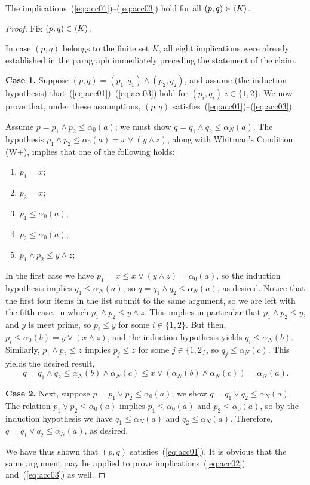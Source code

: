 \begin{claim}\label{claim:main_alpha}
  The implications~(\ref{eq:acc01})--(\ref{eq:acc03}) hold for all $(p,q) \in \langle K\rangle$.
  \end{claim}
  \begin{proof}
    Fix $(p, q) \in  \langle K\rangle$. 
  
    In case $(p,q)$ belongs to the finite set $K$, all eight implications were already 
    established in the paragraph immediately preceding the statement of the claim.
    
    \medskip
    \noindent \textbf{Case 1.}
    Suppose $(p,q) = (p_1, q_1) \wedge (p_2, q_2)$, and assume (the induction hypothesis) 
    that~(\ref{eq:acc01})--(\ref{eq:acc03}) hold for
    $(p_i,q_i)$ $i\in \{1,2\}$.
    We now prove that, under these assumptions, $(p,q)$ 
    satisfies~(\ref{eq:acc01})--(\ref{eq:acc03}).
    
    Assume $p = p_1\wedge p_2 \leq \alpha_0(a)$; we must show 
    $q=q_1\wedge q_2 \leq \alpha_N(a)$.
    The hypothesis $p_1\wedge p_2 \leq \alpha_0(a) = x\vee (y \wedge z)$, along with 
    Whitman's Condition (W+), implies that one of the following holds:
    \begin{enumerate}
      \item   $p_1=x$;  
      \item   $p_2=x$;  
      \item   $p_1\leq \alpha_0(a)$;  
      \item   $p_2\leq \alpha_0(a)$;  
      \item   $p_1\wedge p_2 \leq y \wedge z$;  
    \end{enumerate}
    In the first case we have $p_1 = x \leq x \vee (y \wedge z) = \alpha_0(a)$, so
    the induction hypothesis implies $q_1\leq \alpha_N(a)$, so 
    $q = q_1\wedge q_2\leq \alpha_N(a)$, as desired.  
    Notice that the first four items in the list submit to the same argument,
    so we are left with the fifth case, 
    in which $p_1\wedge p_2 \leq y \wedge z$. 
    This implies in particular that $p_1\wedge p_2 \leq y$, and $y$ is meet prime, so 
    $p_i\leq y$ for some $i\in \{1,2\}$.  
    But then, $p_i \leq \alpha_0(b) = y\vee (x\wedge z)$, and the induction hypothesis
    yields $q_i \leq \alpha_N(b)$.
    Similarly, $p_1\wedge p_2 \leq z$ implies 
    $p_j\leq z$ for some $j\in \{1,2\}$, so $q_j \leq \alpha_N(c)$.
    This yields the desired result,
    \[
    q = q_1\wedge q_2 \leq \alpha_N(b) \wedge \alpha_N(c) 
    \leq x \vee (\alpha_N(b)\wedge \alpha_N(c)) = \alpha_N(a).
    \] 
  
    \medskip
    \noindent \textbf{Case 2.}
    Next, suppose $p = p_1\vee p_2 \leq \alpha_0(a)$; we show 
    $q = q_1 \vee q_2 \leq \alpha_N(a)$. 
    The relation $p_1\vee p_2 \leq \alpha_0(a)$ implies 
    $p_1\leq \alpha_0(a)$ and $p_2\leq \alpha_0(a)$, 
    so by the induction hypothesis we have 
    $q_1\leq \alpha_N(a)$ and $q_2\leq \alpha_N(a)$.  
    Therefore, $q = q_1 \vee q_2 \leq \alpha_N(a)$, as desired.

    We have thus shown that $(p,q)$ satisfies~(\ref{eq:acc01}).
    It is obvious that the same argument may be applied to prove 
    implications~(\ref{eq:acc02}) and~(\ref{eq:acc03}) as well.
  \end{proof}
  
